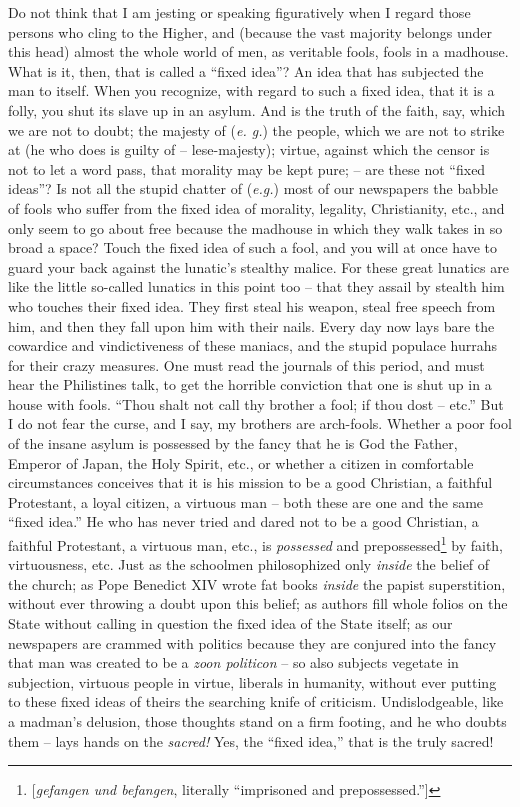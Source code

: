 Do not think that I am jesting or speaking figuratively when I regard those 
persons who cling to the Higher, and (because the vast majority belongs under 
this head) almost the whole world of men, as veritable fools, fools in a 
madhouse. What is it, then, that is called a ``fixed idea''? An idea that 
has subjected the man to itself. When you recognize, with regard to such a 
fixed idea, that it is a folly, you shut its slave up in an asylum. And is the 
truth of the faith, say, which we are not to doubt; the majesty of (\textit{e. 
g.}) the people, which we are not to strike at (he who does is guilty of -- 
lese-majesty); virtue, against which the censor is not to let a word pass, 
that morality may be kept pure; -- are these not ``fixed ideas''? Is not all 
the stupid chatter of (\textit{e.g.}) most of our newspapers the babble of 
fools who suffer from the fixed idea of morality, legality, Christianity, 
etc., and only seem to go about free because the madhouse in which they walk 
takes in so broad a space? Touch the fixed idea of such a fool, and you will 
at once have to guard your back against the lunatic's stealthy malice. For 
these great lunatics are like the little so-called lunatics in this point too 
-- that they assail by stealth him who touches their fixed idea. They first 
steal his weapon, steal free speech from him, and then they fall upon him with 
their nails. Every day now lays bare the cowardice and vindictiveness of these 
maniacs, and the stupid populace hurrahs for their crazy measures. One must 
read the journals of this period, and must hear the Philistines talk, to get 
the horrible conviction that one is shut up in a house with fools. ``Thou 
shalt not call thy brother a fool; if thou dost -- etc.'' But I do not fear 
the curse, and I say, my brothers are arch-fools. Whether a poor fool of the 
insane asylum is possessed by the fancy that he is God the Father, Emperor of 
Japan, the Holy Spirit, etc., or whether a citizen in comfortable 
circumstances conceives that it is his mission to be a good Christian, a 
faithful Protestant, a loyal citizen, a virtuous man -- both these are one and 
the same ``fixed idea.'' He who has never tried and dared not to be a good 
Christian, a faithful Protestant, a virtuous man, etc., is \textit{possessed} 
and prepossessed\footnote{[\textit{gefangen und befangen}, literally 
``imprisoned and prepossessed.'']} by faith, virtuousness, etc. Just as the 
schoolmen philosophized only \textit{inside} the belief of the church; as Pope 
Benedict XIV wrote fat books \textit{inside} the papist superstition, without 
ever throwing a doubt upon this belief; as authors fill whole folios on the 
State without calling in question the fixed idea of the State itself; as our 
newspapers are crammed with politics because they are conjured into the fancy 
that man was created to be a \textit{zoon politicon} -- so also subjects 
vegetate in subjection, virtuous people in virtue, liberals in humanity, 
without ever putting to these fixed ideas of theirs the searching knife of 
criticism. Undislodgeable, like a madman's delusion, those thoughts stand on a 
firm footing, and he who doubts them -- lays hands on the \textit{sacred!} 
Yes, the ``fixed idea,'' that is the truly sacred!

